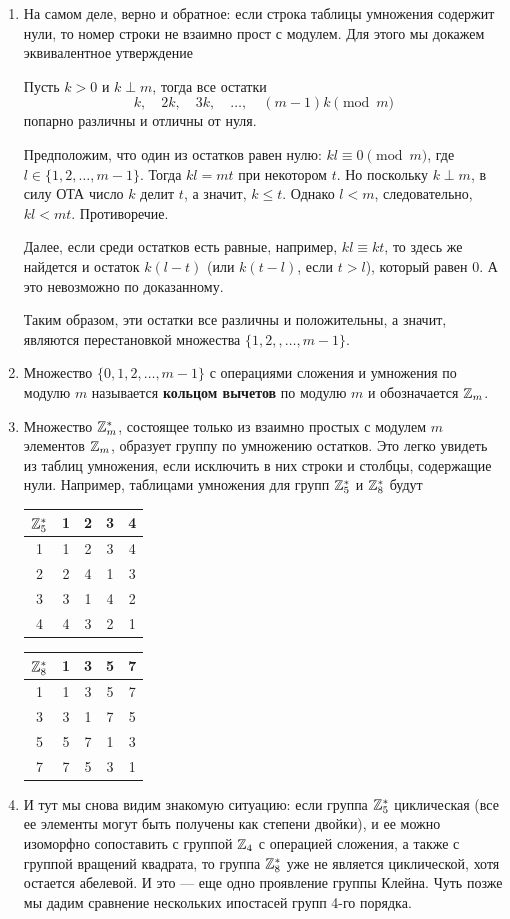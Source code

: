 \begin{enumerate}
\item На самом деле, верно и обратное: если строка таблицы умножения содержит нули, то номер строки не взаимно прост с модулем. Для этого мы докажем эквивалентное утверждение
\begin{thrm}
Пусть $k>0$  и  $k\perp m$, тогда все остатки
$$
k,\quad 2k,\quad 3k,\quad\dots,\quad (m-1)k\pmod m
$$
попарно различны и отличны от нуля.
\end{thrm}
\pf Предположим, что один из остатков равен нулю: $kl\equiv 0\pmod m$, где $l\in\{1,2,\dots,m-1\}$. Тогда $kl=mt$ при некотором $t$. Но поскольку $k\perp m$, в силу ОТА число $k$ делит $t$, а значит, $k\le t$. Однако $l<m$, следовательно, $kl<mt$. Противоречие.

Далее, если среди остатков есть равные, например, $kl\equiv kt$, то здесь же найдется и остаток $k(l-t)$ (или $k(t-l)$, если $t>l$), который равен 0. А это невозможно по доказанному. 

Таким образом, эти остатки все различны и положительны, а значит, являются перестановкой множества $\{1,2,,\dots,m-1\}$.
\epf
\item Множество $\{0,1,2,\dots,m-1\}$ с операциями сложения и умножения по модулю $m$ называется \textbf{кольцом вычетов} по модулю $m$ и обозначается $\mathbb Z_m$.
\item Множество $\mathbb Z_m^*$, состоящее только из взаимно простых с модулем $m$ элементов $\mathbb Z_m$, образует группу по умножению остатков. Это легко увидеть из таблиц умножения, если исключить в них строки и столбцы, содержащие нули. Например, таблицами умножения для групп $\mathbb Z_5^*$ и $\mathbb Z_8^*$ будут
\begin{center}
\begin{tabular}{c||c|c|c|c|}
$\mathbb Z_5^*$  & 1 & 2 & 3 & 4 \\ \hline\hline
        1 & 1 & 2 & 3 & 4 \\ \hline
        2 & 2 & 4 & 1 & 3 \\ \hline
        3 & 3 & 1 & 4 & 2 \\ \hline
        4 & 4 & 3 & 2 & 1 \\ \hline
\end{tabular}
\qquad
\begin{tabular}{c||c|c|c|c|}
$\mathbb Z_8^*$  & 1 & 3 & 5 & 7 \\ \hline\hline
        1 & 1 & 3 & 5 & 7 \\ \hline
        3 & 3 & 1 & 7 & 5 \\ \hline
        5 & 5 & 7 & 1 & 3 \\ \hline
        7 & 7 & 5 & 3 & 1 \\ \hline
\end{tabular}
\end{center}
\item И тут мы снова видим знакомую ситуацию: если группа $\mathbb Z_5^*$ циклическая (все ее элементы могут быть получены как степени двойки), и ее можно изоморфно сопоставить с группой $\mathbb Z_4$ с операцией сложения, а также с группой вращений квадрата, то группа $\mathbb Z_8^*$ уже не является циклической, хотя остается абелевой. И это --- еще одно проявление группы Клейна. Чуть позже мы дадим сравнение нескольких ипостасей групп 4-го порядка.


\end{enumerate}
